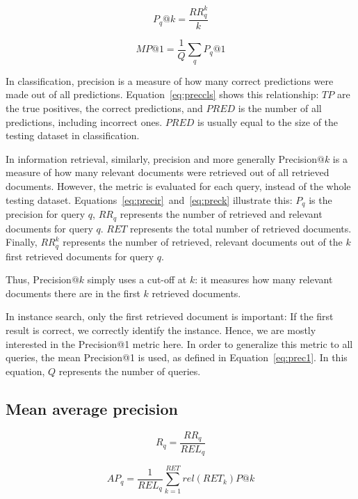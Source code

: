 \begin{equation}\label{eq:preck}
P_q@k = \frac{RR^k_q}{k}
\end{equation}

\begin{equation}\label{eq:prec1}
MP@1 = \frac{1}{Q} \sum_q P_q@1
\end{equation}

In classification, precision is a measure of how many correct predictions
were made out of all predictions. Equation~\ref{eq:preccls} shows this
relationship: $TP$ are the true positives, the correct predictions,
and $PRED$ is the number of all predictions, including incorrect ones.
$PRED$ is usually equal to the size of the testing dataset in classification.

In information retrieval, similarly,
precision and more generally Precision$@k$ is a measure of how many
relevant documents were retrieved out of all retrieved documents.
However, the metric is evaluated for each query, instead of the whole
testing dataset.
Equations~\ref{eq:precir}~and~\ref{eq:preck} illustrate this: $P_q$ is
the precision for query $q$, $RR_q$ represents the number of retrieved
and relevant documents for query $q$.
$RET$ represents the total number of retrieved documents. Finally, $RR^k_q$
represents the number of retrieved, relevant documents out of the $k$ first
retrieved documents for query $q$.

Thus, Precision$@k$ simply uses a cut-off at $k$: it measures how many
relevant documents there are in the first $k$ retrieved documents.

In instance search, only the first retrieved document is important:
If the first result is correct, we correctly identify the instance.
Hence, we are mostly interested in the Precision@1 metric here.
In order to generalize this metric to all queries, the mean Precision@1
is used, as defined in Equation~\ref{eq:prec1}. In this equation,
$Q$ represents the number of queries.

\subsection{Mean average precision}
\begin{equation}\label{eq:recall}
R_q = \frac{RR_q}{REL_q}
\end{equation}

\begin{equation}\label{eq:ap}
AP_q = \frac{1}{REL_q} \sum_{k=1}^{RET} rel(RET_k)P@k
\end{equation}

